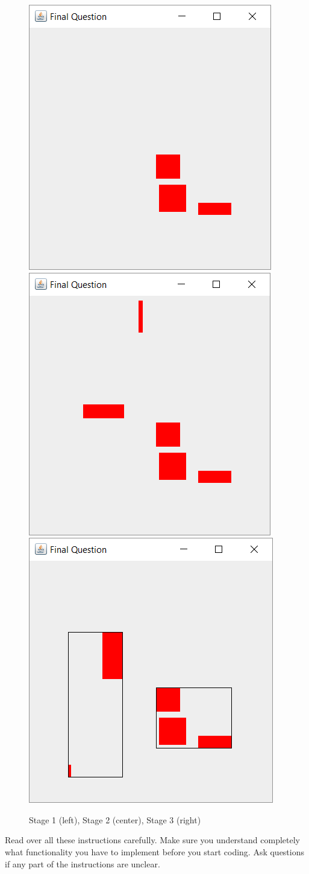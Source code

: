 \documentclass[12pt,twoside]{article}
\begin{document}
\begin{figure}
	\begin{center}
		\includegraphics[width=0.32\linewidth]{stage1.PNG}
		\includegraphics[width=0.32\linewidth]{stage2.PNG}
		\includegraphics[width=0.32\linewidth]{stage3.PNG}
	\end{center}
	\caption*{Stage 1 (left), Stage 2 (center), Stage 3 (right)}
	\label{fig:one}
\end{figure}


Read over all these instructions carefully.  Make sure you understand completely what functionality you have to implement before you start coding.  Ask questions if any part of the instructions are unclear.
\end{document}
